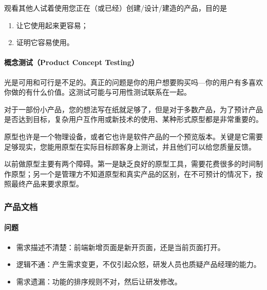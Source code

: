 \documentclass[letterpaper,11pt,english]{sphinxmanual}
\begin{document}
观看其他人试着使用您正在（或已经）创建/设计/建造的产品，目的是
%
\begin{footnote}[733]\sphinxAtStartFootnote
{}
%
\end{footnote}
\begin{enumerate}
%
\item {} 
让它使用起来更容易；

\item {} 
证明它容易使用。

\end{enumerate}


\paragraph{概念测试（Product Concept Testing）}
\label{\detokenize{chapter_project/inspect:product-concept-testing}}
光是可用和可行是不足的。真正的问题是你的用户想要购买吗—你的用户有多喜欢\sphinxhyphen{}你做的有什么价值。这测试可能与可用性测试联系在一起。

对于一部份小产品，您的想法写在纸就足够了，但是对于多数产品，为了预计产品是否达到目标，复杂用户互作用或新技术的使用、某种形式原型都是非常重要的。

原型也许是一个物理设备，或者它也许是软件产品的一个预览版本。关键是它需要足够现实，您能用原型在实际目标顾客身上测试，并且他们可以给您质量反馈。

以前做原型主要有两个障碍。第一是缺乏良好的原型工具，需要花费很多的时间制作原型；另一个是管理方不知道原型和真实产品的区别，在不可预计的情况下，按照最终产品来要求原型。


\subsubsection{产品文档}
\label{\detokenize{chapter_project/product_document:id1}}\label{\detokenize{chapter_project/product_document::doc}}

\paragraph{问题}
\label{\detokenize{chapter_project/product_document:id2}}\begin{itemize}
\item {} 
需求描述不清楚：前端新增页面是新开页面，还是当前页面打开。

\item {} 
逻辑不通：产生需求变更，不仅引起众怒，研发人员也质疑产品经理的能力。

\item {} 
需求遗漏：功能的排序规则不对，然后让研发修改。

\end{itemize}
\end{document}

